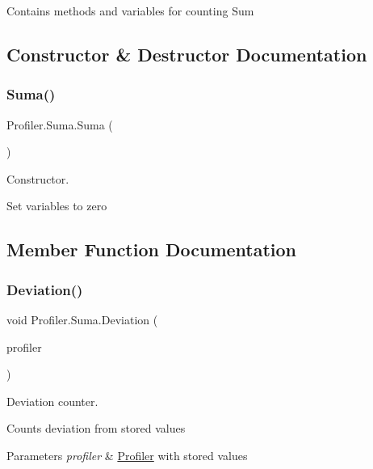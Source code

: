 Contains methods and variables for counting Sum 

\subsection{Constructor \& Destructor Documentation}
\mbox{\label{classProfiler_1_1Suma_a7ac4ae65701886743c0e13e25eedb21c}} 
\subsubsection{\texorpdfstring{Suma()}{Suma()}}
{\footnotesize\ttfamily Profiler.\+Suma.\+Suma (\begin{DoxyParamCaption}{ }\end{DoxyParamCaption})\hspace{0.3cm}{\ttfamily [inline]}}



Constructor. 

Set variables to zero 

\subsection{Member Function Documentation}
\mbox{\label{classProfiler_1_1Suma_ac706fdbb956efae8fca51cb6bdb08bfd}} 
\subsubsection{\texorpdfstring{Deviation()}{Deviation()}}
{\footnotesize\ttfamily void Profiler.\+Suma.\+Deviation (\begin{DoxyParamCaption}\item[{\hyperlink{classProfiler_1_1ProfilerCounters}{Profiler\+Counters}}]{profiler }\end{DoxyParamCaption})\hspace{0.3cm}{\ttfamily [inline]}}



Deviation counter. 

Counts deviation from stored values 
\begin{DoxyParams}{Parameters}
{\em profiler} & \hyperlink{classProfiler_1_1Profiler}{Profiler} with stored values \\
\hline
\end{DoxyParams}


